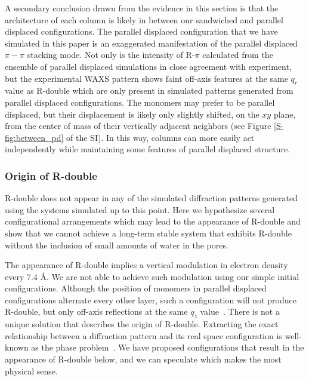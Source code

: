 \documentclass[journal=jpcbfk,manuscript=article]{achemso}
\begin{document}
  A secondary conclusion drawn from the evidence in this section is 
  that the architecture of each column is likely in between our sandwiched
  and parallel displaced configurations. The parallel displaced configuration 
  that we have simulated in this paper is an exaggerated manifestation of the 
  parallel displaced $\pi-\pi$ stacking mode. Not only is the intensity of R-$\pi$
  calculated from the ensemble of parallel displaced simulations in close agreement
  with experiment, but the experimental WAXS pattern shows faint off-axis features
  at the same $q_r$ value as R-double which are only present in simulated patterns
  generated from parallel displaced configurations. The monomers may prefer to be
  parallel displaced, but their displacement is likely only slightly shifted, on 
  the $xy$ plane, from the center of mass of their vertically adjacent neighbors 
  (see Figure \ref{S-fig:between_pd} of the SI). In this way,
  columns can more easily act 
  independently while maintaining some features of parallel displaced structure. 

  \subsubsection{Origin of R-double}\label{section:rdouble}
  
  R-double does not appear in any of the simulated diffraction patterns
  generated using the systems simulated up to this point. Here we hypothesize 
  several configurational arrangements which may lead to the appearance of R-double and
  show that we cannot achieve a long-term stable system that exhibits R-double
  without the inclusion of small amounts of water in the pores.
  
  The appearance of R-double implies a vertical modulation in electron density
  every 7.4 \AA. We are not able to achieve such modulation using our simple
  initial configurations. Although the position of monomers in parallel displaced
  configurations alternate every other layer, such a configuration will not
  produce R-double, but only off-axis reflections at the same $q_z$
  value~\cite{harburn_atlas_1975}. There is not a unique solution that describes
  the origin of R-double. Extracting the exact relationship between a diffraction
  pattern and its real space configuration is well-known as the phase
  problem~\cite{taylor_phase_2003}. We have proposed configurations that
  result in the appearance of R-double below, and we can speculate which makes
  the most physical sense. 
  
\end{document}

